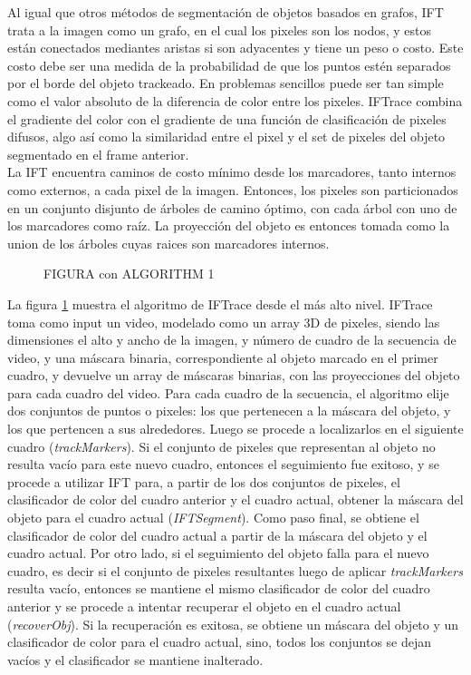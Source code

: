 \documentclass[a4paper,10pt]{article}
\begin{document}
Al igual que otros métodos de segmentación de objetos basados en grafos, IFT trata a la imagen como un grafo, en el cual los pixeles son los nodos, y
estos están conectados mediantes aristas si son adyacentes y tiene un peso o costo. Este costo debe ser una medida de la probabilidad de que 
los puntos estén separados por el borde del objeto trackeado. En problemas sencillos puede ser tan simple como el valor absoluto de la diferencia de color 
entre los pixeles. IFTrace combina el gradiente del color con el gradiente de una función de clasificación de pixeles difusos, algo así como la similaridad entre el pixel 
y el set de pixeles del objeto segmentado en el frame anterior. \\

La IFT encuentra caminos de costo mínimo desde los marcadores, tanto internos como externos, a cada pixel de la imagen. Entonces, los pixeles son particionados en un conjunto
disjunto de árboles de camino óptimo, con cada árbol con uno de los marcadores como raíz. La proyección del objeto es entonces tomada como la union de los árboles cuyas raices 
son marcadores internos.\\

 \begin{figure}[H]
        \caption{FIGURA con ALGORITHM 1}
        \label{fig:IFTrace-algorithm1}
\end{figure}


La figura \ref{fig:IFTrace-algorithm1} muestra el algoritmo de IFTrace desde el más alto nivel.
IFTrace toma como input un video, modelado como un array 3D de pixeles, siendo las dimensiones el alto y ancho de la imagen, y número de cuadro de la secuencia de video, y una 
máscara binaria, correspondiente al objeto marcado en el primer cuadro, y devuelve un array de máscaras binarias, con las proyecciones del objeto para cada cuadro del video.
Para cada cuadro de la secuencia, el algoritmo elije dos conjuntos de puntos o pixeles: los que pertenecen a la máscara del objeto, y los que pertencen a sus alrededores. Luego se 
procede 
a localizarlos en el siguiente cuadro (\textit{trackMarkers}). Si el conjunto de pixeles que representan al objeto no resulta vacío para este nuevo cuadro, entonces el seguimiento
fue exitoso, y se procede a utilizar IFT para, a partir de los dos conjuntos de pixeles, el clasificador de color del cuadro anterior y el cuadro actual, obtener la máscara del 
objeto para el cuadro actual (\textit{IFTSegment}). Como paso final, se obtiene el clasificador de color del cuadro actual a partir de la máscara del objeto y el cuadro actual.
Por otro lado, si el seguimiento del objeto falla para el nuevo cuadro, es decir si el conjunto de pixeles resultantes luego de aplicar \textit{trackMarkers} resulta vacío, 
entonces se mantiene el mismo clasificador de color del cuadro anterior y se procede
a intentar recuperar el objeto en el cuadro actual (\textit{recoverObj}). Si la recuperación
es exitosa, se obtiene un máscara del objeto y un clasificador de color para el cuadro actual,
sino, todos los conjuntos se dejan vacíos y el clasificador se mantiene inalterado.\
\end{document}
